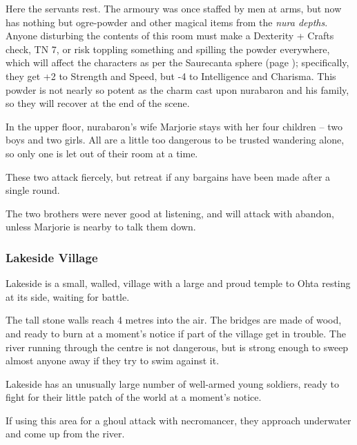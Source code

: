 \begin{multicols}{2}
\nurabaron


Here the servants rest.
The armoury was once staffed by men at arms, but now has nothing but ogre-powder and other magical items from the \textit{nura depths}.
Anyone disturbing the contents of this room must make a Dexterity + Crafts check, TN 7, or risk toppling something and spilling the powder everywhere, which will affect the characters as per the Saurecanta sphere (page \pageref{saurecanta}); specifically, they get +2 to Strength and Speed, but -4 to Intelligence and Charisma.
This powder is not nearly so potent as the charm cast upon \gls{nurabaron} and his family, so they will recover at the end of the scene.


In the upper floor, \gls{nurabaron}'s wife Marjorie stays with her four children -- two boys and two girls.  All are a little too dangerous to be trusted wandering alone, so only one is let out of their room at a time.


These two attack fiercely, but retreat if any bargains have been made after a single round.


The two brothers were never good at listening, and will attack with abandon, unless Marjorie is nearby to talk them down.

\subsubsection{Lakeside Village}

\begin{figure*}[t]



\label{lakeside}

\end{figure*}

Lakeside is a small, walled, village with a large and proud temple to Ohta resting at its side, waiting for battle.

The tall stone walls reach 4 metres into the air.
The bridges are made of wood, and ready to burn at a moment's notice if part of the village get in trouble.
The river running through the centre is not dangerous, but is strong enough to sweep almost anyone away if they try to swim against it.

Lakeside has an unusually large number of well-armed young soldiers, ready to fight for their little patch of the world at a moment's notice.

If using this area for a ghoul attack with \gls{necromancer}, they approach underwater and come up from the river.


\end{multicols}
